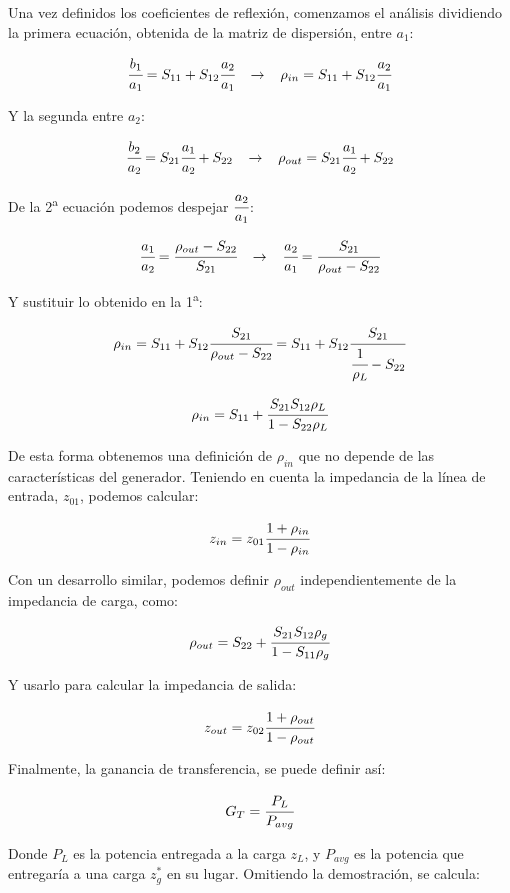 \documentclass[12pt]{article}
\begin{document}
Una vez definidos los coeficientes de reflexi\'on, comenzamos el an\'alisis dividiendo la primera ecuaci\'on, obtenida de la matriz de dispersi\'on, entre $a_1$:

$$\cfrac{b_1}{a_1} = S_{11} + S_{12}\cfrac{a_2}{a_1} \hspace{0.3cm} \rightarrow \hspace{0.3cm} \rho_{in} = S_{11} + S_{12}\cfrac{a_2}{a_1}$$

Y la segunda entre $a_2$:

$$\cfrac{b_2}{a_2} = S_{21}\cfrac{a_1}{a_2} + S_{22} \hspace{0.3cm} \rightarrow \hspace{0.3cm} \rho_{out} = S_{21}\cfrac{a_1}{a_2} + S_{22}$$

De la 2\textsuperscript{a} ecuaci\'on podemos despejar $\cfrac{a_2}{a_1}$:

$$\cfrac{a_1}{a_2} = \cfrac{\rho_{out} - S_{22}}{S_{21}} \hspace{0.3cm} \rightarrow \hspace{0.3cm} \cfrac{a_2}{a_1} = \cfrac{S_{21}}{\rho_{out} - S_{22}}$$

Y sustituir lo obtenido en la 1\textsuperscript{a}:

$$\rho_{in} = S_{11} + S_{12}\cfrac{S_{21}}{\rho_{out} - S_{22}} = S_{11} + S_{12}\cfrac{S_{21}}{\cfrac{1}{\rho_L} - S_{22}}$$

$$\rho_{in} = S_{11} + \cfrac{S_{21}S_{12}\rho_L}{1 - S_{22}\rho_L}$$

De esta forma obtenemos una definici\'on de $\rho_{in}$ que no depende de las caracter\'isticas del generador. Teniendo en cuenta la impedancia de la l\'inea de entrada, $z_{01}$, podemos calcular:

$$z_{in} = z_{01}\cfrac{1+\rho_{in}}{1-\rho_{in}}$$

Con un desarrollo similar, podemos definir $\rho_{out}$ independientemente de la impedancia de carga, como:

$$\rho_{out} = S_{22} + \cfrac{S_{21}S_{12}\rho_g}{1 - S_{11}\rho_g}$$

Y usarlo para calcular la impedancia de salida:

$$z_{out} = z_{02}\cfrac{1+\rho_{out}}{1-\rho_{out}}$$

Finalmente, la ganancia de transferencia, se puede definir as\'i:

$$G_T = \cfrac{P_L}{P_{avg}}$$

Donde $P_L$ es la potencia entregada a la carga $z_L$, y $P_{avg}$ es la potencia que entregar\'ia a una carga $z_g^*$ en su lugar. Omitiendo la demostraci\'on, se calcula:
\end{document}
